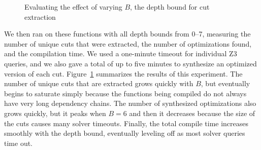 \begin{figure}[tbp]
  \centering
  \hfill
  \hfill
  \caption{Evaluating the effect of varying $B$, the depth bound for
    cut extraction}
  \label{fig:loop}
\end{figure}


We then ran \minotaur{} on these functions with all depth bounds from
0--7, measuring the number of unique cuts that were extracted, the
number of optimizations found, and the compilation time.
%
We used a one-minute timeout for individual Z3 queries, and we also
gave \minotaur{} a total of up to five minutes to synthesize an optimized
version of each cut.
%
Figure~\ref{fig:loop} summarizes the results of this experiment.
%
The number of unique cuts that are extracted grows quickly with $B$,
but eventually begins to saturate simply because the functions being
compiled do not always have very long dependency chains.
%
The number of synthesized optimizations also grows quickly, but it
peaks when $B=6$ and then it decreases because the size of the cuts
causes many solver timeouts.
%
Finally, the total compile time increases smoothly with the depth
bound, eventually leveling off as most solver queries time out.


